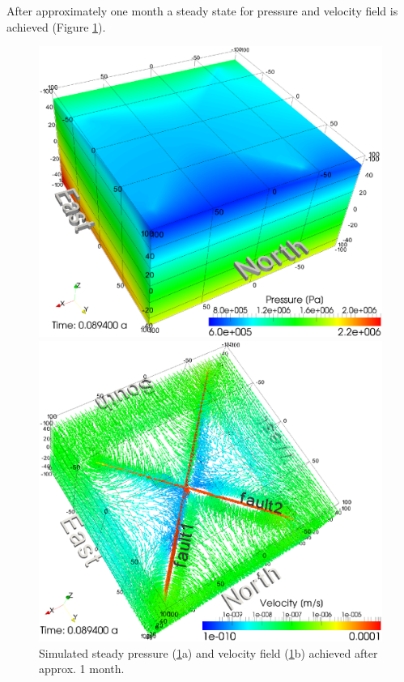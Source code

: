 After approximately one month a steady state for pressure and velocity field is achieved (Figure \ref{fig4}).
\begin{figure}[htbp]
    \begin{center}
        \begin{minipage}{0.40\textwidth}
            \includegraphics[width=1\textwidth]{T/figures/2u2f_fig4a.eps}
        \end{minipage}
        \begin{minipage}{0.40\textwidth}
            \includegraphics[width=1\textwidth]{T/figures/2u2f_fig4b.eps}
        \end{minipage}
        \caption{Simulated steady pressure (\ref{fig4}a) and velocity field (\ref{fig4}b) achieved after approx. 1 month.}
        \label{fig4}
    \end{center}
\end{figure}

